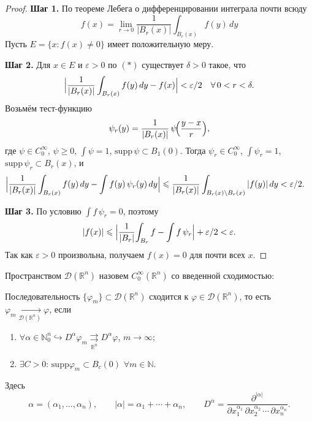 \begin{proof}
    \textbf{Шаг 1.}
    По теореме Лебега о дифференцировании интеграла почти всюду
    \[
        f(x)
        =\lim_{r\to0}\frac1{|B_r(x)|}\int_{B_r(x)}f(y)\,dy
        \tag{$*$}
    \]
    Пусть $E=\{x:f(x)\neq0\}$ имеет положительную меру.

    \textbf{Шаг 2.}
    Для $x\in E$ и $\varepsilon>0$ по $(*)$ существует $\delta>0$ такое, что
    \[
        \Bigl|\frac1{|B_r(x)|}\int_{B_r(x)}f(y)\,dy - f(x)\Bigr|<\varepsilon/2
        \quad
        \forall\,0<r<\delta.
    \]
    Возьмём тест-функцию
    \[
        \psi_r(y)
        =\frac1{|B_r(x)|}\,\psi\!\Bigl(\frac{y-x}{r}\Bigr),
    \]
    где $\psi\in C_0^\infty$, $\psi\ge0$, $\int\psi=1$, $\mathrm{supp}\,\psi\subset B_1(0)$.
    Тогда $\psi_r\in C_0^\infty$, $\int\psi_r=1$, $\mathrm{supp}\,\psi_r\subset B_r(x)$, и
    \begin{align*}
        \Bigl|\frac1{|B_r(x)|}\int_{B_r(x)}f(y)\,dy - \int f(y)\,\psi_r(y)\,dy\Bigr|
        &\le
        \frac1{|B_r(x)|}\int_{B_{r}(x)\setminus B_r(x)}|f(y)|\,dy
        <\varepsilon/2.
    \end{align*}

    \textbf{Шаг 3.}
    По условию $\int f\,\psi_r=0$, поэтому
    \[
        |f(x)| \le \Bigl|\frac1{|B_r|}\!\int_{B_r}f - \int f\,\psi_r\Bigr| + \varepsilon/2
        <\varepsilon.
    \]
    Так как $\varepsilon>0$ произвольна, получаем $f(x)=0$ для почти всех $x$.
\end{proof}

\begin{definition}
    Пространством $\mathcal{D}(\mathbb{R}^n)$ назовем $C_0^\infty(\mathbb{R}^n)$ со введенной сходимостью:

    Последовательность $\{ \varphi_m\} \subset \mathcal{D}(\mathbb{R}^n)$ сходится к $\varphi \in \mathcal{D}(\mathbb{R}^n)$, то есть $\varphi_m \xrightarrow[\mathcal{D}(\mathbb{R}^n)]{} \varphi$, если
    \begin{enumerate}
        \item $\forall \alpha \in \mathbb{N}^n_0 \hookrightarrow D^{\alpha} \varphi_m \mathrel{\mathop{\rightrightarrows}\limits_{\mathbb{R}^n}} D^{\alpha} \varphi$, $m \to \infty$;
        \item $\exists C > 0$: $\text{supp}\varphi_m \subset B_c(0)$ $\forall m \in \mathbb{N}$.
    \end{enumerate}

    Здесь
    \[
        \alpha = (\alpha_1, \ldots, \alpha_n), \qquad
        |\alpha|=\alpha_1+\cdots+\alpha_n,
        \qquad
        D^\alpha
        =\frac{\partial^{|\alpha|}}{\partial x_1^{\alpha_1}\,\partial x_2^{\alpha_2}\,\cdots\,\partial x_n^{\alpha_n}}.
    \]
\end{definition}


